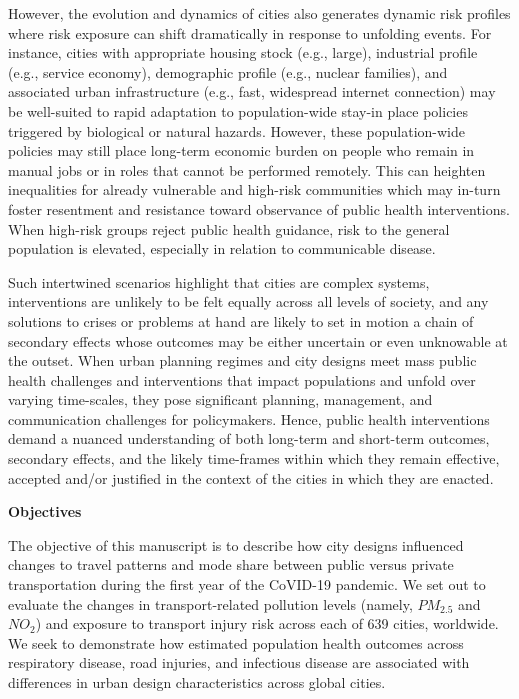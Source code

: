 \documentclass[preprint,12pt]{elsarticle}
\begin{document}
However, the evolution and dynamics of cities also generates dynamic risk profiles where risk exposure can shift dramatically in response to unfolding events. For instance, cities with appropriate housing stock (e.g., large), industrial profile (e.g., service economy), demographic profile (e.g., nuclear families), and associated urban infrastructure (e.g., fast, widespread internet connection) may be well-suited to rapid adaptation to population-wide stay-in place policies triggered by biological or natural hazards\cite{hale2021global}. However, these population-wide policies may still place long-term economic burden on people who remain in manual jobs or in roles that cannot be performed remotely\cite{CraigWFH,Vyas2021}. This can heighten inequalities for already vulnerable and high-risk communities\cite{martin2020fighting} which may in-turn foster resentment and resistance toward observance of public health interventions\cite{de2016sustainability}. When high-risk groups reject public health guidance, risk to the general population is elevated, especially in relation to communicable disease\cite{koopman2005control}.

Such intertwined scenarios highlight that cities are complex systems\cite{DiezRoux2015}, interventions are unlikely to be felt equally across all levels of society, and any solutions to crises or problems at hand are likely to set in motion a chain of secondary effects whose outcomes may be either uncertain or even unknowable at the outset\cite{Sterman2006}. When urban planning regimes and city designs meet mass public health challenges and interventions that impact populations and unfold over varying time-scales\cite{casti2012x}, they pose significant planning, management, and communication challenges for policymakers\cite{thompson2022modelling,thompson2022framework}. Hence, public health interventions demand a nuanced understanding of both long-term and short-term  outcomes, secondary effects, and the likely time-frames within which they remain effective, accepted and/or justified in the context of the cities in which they are enacted\cite{dawson2016snakes, oliu2021sars}.


\textbf{Objectives}

The objective of this manuscript is to describe how city designs influenced changes to travel patterns and mode share between public versus private transportation during the first year of the CoVID-19 pandemic. We set out to evaluate the changes in transport-related pollution levels (namely, \(PM_{2.5}\) and \(NO_{2}\)) and exposure to transport injury risk across each of 639 cities, worldwide. We seek to demonstrate how estimated population health outcomes across respiratory disease, road injuries, and infectious disease are associated with differences in urban design characteristics across global cities.
\end{document}
